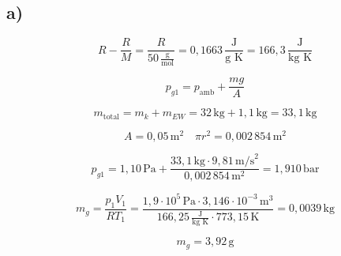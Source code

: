 

\subsection*{a)}

\[
R - \frac{R}{M} = \frac{R}{50 \, \frac{\text{g}}{\text{mol}}} = 0{,}1663 \, \frac{\text{J}}{\text{g K}} = 166{,}3 \, \frac{\text{J}}{\text{kg K}}
\]

\[
p_{g1} = p_{\text{amb}} + \frac{mg}{A}
\]

\[
m_{\text{total}} = m_k + m_{EW} = 32 \, \text{kg} + 1{,}1 \, \text{kg} = 33{,}1 \, \text{kg}
\]

\[
A = 0{,}05 \, \text{m}^2 \quad \pi r^2 = 0{,}002 \, 854 \, \text{m}^2
\]

\[
p_{g1} = 1{,}10 \, \text{Pa} + \frac{33{,}1 \, \text{kg} \cdot 9{,}81 \, \text{m/s}^2}{0{,}002 \, 854 \, \text{m}^2} = 1{,}910 \, \text{bar}
\]

\[
m_g = \frac{p_1 V_1}{R T_1} = \frac{1{,}9 \cdot 10^5 \, \text{Pa} \cdot 3{,}146 \cdot 10^{-3} \, \text{m}^3}{166{,}25 \, \frac{\text{J}}{\text{kg K}} \cdot 773{,}15 \, \text{K}} = 0{,}0039 \, \text{kg}
\]

\[
m_g = 3{,}92 \, \text{g}
\]